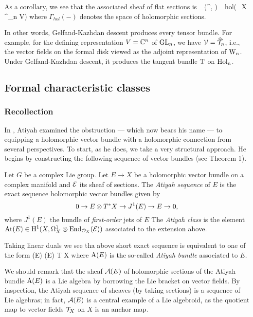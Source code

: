 As a corollary, we see that the associated sheaf of flat sections is
\ben
\sdesc_{\GK}(\omega^\sigma, \cV) \cong \Gamma_{hol}(\Fr_X
\times^{\GL_n} V)
\een
where $\Gamma_{hol}(-)$ denotes the space of holomorphic sections. 

In other words, Gelfand-Kazhdan descent produces every tensor bundle. 
For example, for the defining representation $V = \mathbb C^n$ of ${\rm GL}_n$, we have $\mathcal{V} =\widehat{\mathcal T}_n$, 
i.e., the vector fields on the formal disk viewed as the adjoint representation of  ${{\rm W}_n}$. 
Under Gelfand-Kazhdan descent, it produces the tangent bundle ${\rm T}$ on ${\rm Hol}_n$.


\subsection{Formal characteristic classes}

\subsubsection{Recollection}

In \cite{atiyah}, Atiyah examined the obstruction --- which now bears his name --- to equipping a holomorphic vector bundle with a holomorphic connection from several perspectives. To start, as he does, we take a very structural approach. He begins by constructing the following sequence of vector bundles (see Theorem 1).

\begin{dfn}
Let $G$ be a complex Lie group. Let $E \to X$ be a holomorphic vector
bundle on a complex manifold and $\mathcal E$ its sheaf of sections. The {\em Atiyah sequence} of $E$ is the
exact sequence holomorphic vector bundles given by
\[
0 \to E \otimes T^* X \to J^1(E) \to E \to 0,
\]
where $J^1(E)$ the bundle of {\em first-order} jets of $E$
The {\em Atiyah class} is the element ${\rm At}(E) \in {\rm H}^1(X, \Omega^1_X
\otimes {\rm End}_{\mathcal O_X} (\mathcal E))$ associated to the extension above. 
\end{dfn}

\begin{rmk}
Taking linear duals we see tha above short exact sequence is
equivalent to one of the form
 \to \End (E) (E) \to T X 
\een
where ${\rm A}(E)$ is the so-called {\em Atiyah bundle} associated to $E$. 

We should remark that the sheaf $\mathcal{A}(E)$ of holomorphic sections of the Atiyah bundle ${\rm A}(E)$ is a Lie algebra by borrowing the Lie bracket on vector fields.
By inspection, the Atiyah sequence of sheaves (by taking sections) is a sequence of Lie algebras; 
 in fact, $\mathcal{A}(E)$ is a central example of a Lie algebroid, as the quotient map to vector fields $\mathcal T_X$ on $X$ is an anchor map.
\end{rmk}


